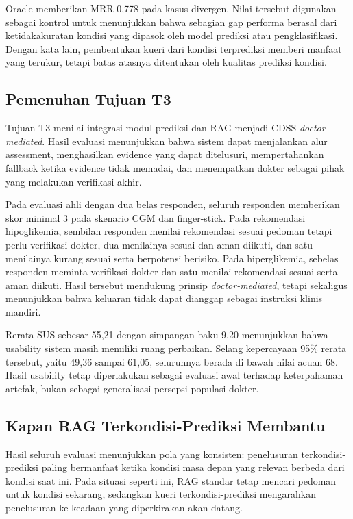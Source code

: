 Oracle memberikan MRR 0,778 pada kasus divergen. Nilai tersebut digunakan sebagai kontrol untuk menunjukkan bahwa sebagian gap performa berasal dari
ketidakakuratan kondisi yang dipasok oleh model prediksi atau pengklasifikasi. Dengan kata lain, pembentukan kueri dari kondisi terprediksi memberi manfaat yang terukur,
tetapi batas atasnya ditentukan oleh kualitas prediksi kondisi.

\subsection{Pemenuhan Tujuan T3}
\label{subsec:bab6-pemenuhan-t3}

Tujuan T3 menilai integrasi modul prediksi dan RAG menjadi CDSS \textit{doctor-mediated}. Hasil evaluasi menunjukkan bahwa sistem dapat menjalankan alur assessment,
menghasilkan evidence yang dapat ditelusuri, mempertahankan fallback ketika evidence tidak memadai, dan menempatkan dokter sebagai pihak yang melakukan
verifikasi akhir.

Pada evaluasi ahli dengan dua belas responden, seluruh responden memberikan skor minimal 3 pada skenario CGM dan finger-stick. Pada rekomendasi
hipoglikemia, sembilan responden menilai rekomendasi sesuai pedoman tetapi perlu verifikasi dokter, dua menilainya sesuai dan aman diikuti, dan satu
menilainya kurang sesuai serta berpotensi berisiko. Pada hiperglikemia, sebelas responden meminta verifikasi dokter dan satu menilai rekomendasi sesuai
serta aman diikuti.
Hasil tersebut mendukung prinsip \textit{doctor-mediated}, tetapi sekaligus menunjukkan bahwa keluaran tidak dapat dianggap sebagai instruksi klinis mandiri.

Rerata SUS sebesar 55,21 dengan simpangan baku 9,20 menunjukkan bahwa usability sistem masih memiliki ruang perbaikan. Selang kepercayaan 95\% rerata
tersebut, yaitu 49,36 sampai 61,05, seluruhnya berada di bawah nilai acuan 68. Hasil usability tetap diperlakukan sebagai evaluasi awal terhadap
keterpahaman artefak, bukan sebagai generalisasi persepsi populasi dokter.

\subsection{Kapan RAG Terkondisi-Prediksi Membantu}
\label{subsec:bab6-kapan-rag-terkondisi-membantu}

Hasil seluruh evaluasi menunjukkan pola yang konsisten: penelusuran terkondisi-prediksi paling bermanfaat ketika kondisi masa depan yang relevan
berbeda dari kondisi saat ini. Pada situasi seperti ini, RAG standar tetap mencari pedoman untuk kondisi sekarang, sedangkan kueri terkondisi-prediksi mengarahkan penelusuran
ke keadaan yang diperkirakan akan datang.

